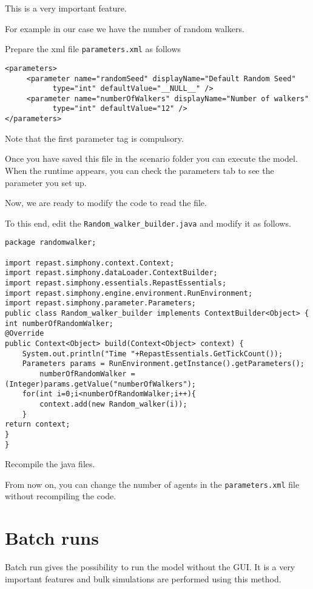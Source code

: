 \documentclass{article}
\begin{document}
This is a very important feature.

For example in our case we have the number of random walkers.

Prepare the xml file \verb+parameters.xml+ as follows 

\begin{verbatim}
<parameters>
	 <parameter name="randomSeed" displayName="Default Random Seed" 
	       type="int" defaultValue="__NULL__" />
	 <parameter name="numberOfWalkers" displayName="Number of walkers" 
	       type="int" defaultValue="12" />
</parameters>
\end{verbatim}

Note that the first parameter tag is compulsory.

Once you have saved this file in the scenario folder you can execute the model. When the runtime appears, you can check the parameters tab to see the parameter you set up.

Now, we are ready to modify the code to read the file.

To this end, edit the \verb+Random_walker_builder.java+ and modify it as follows.

\begin{verbatim}
package randomwalker;

import repast.simphony.context.Context;
import repast.simphony.dataLoader.ContextBuilder;
import repast.simphony.essentials.RepastEssentials;
import repast.simphony.engine.environment.RunEnvironment;
import repast.simphony.parameter.Parameters;
public class Random_walker_builder implements ContextBuilder<Object> {
int numberOfRandomWalker;
@Override
public Context<Object> build(Context<Object> context) {
	System.out.println("Time "+RepastEssentials.GetTickCount());
	Parameters params = RunEnvironment.getInstance().getParameters();
       	numberOfRandomWalker = (Integer)params.getValue("numberOfWalkers");
	for(int i=0;i<numberOfRandomWalker;i++){
		context.add(new Random_walker(i));
	}
return context;
}
}
\end{verbatim}

Recompile the java files.

From now on, you can change the number of agents in the \verb+parameters.xml+ file without recompiling the code.



\section{Batch runs}
Batch run gives the possibility to run the model without the GUI.
It is a very important features and bulk simulations are performed using this method.
\end{document}
